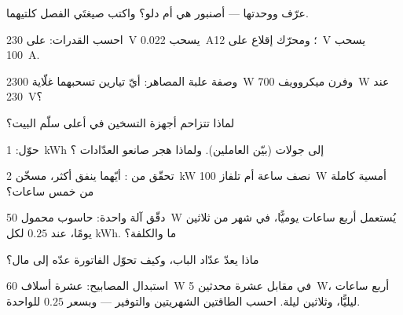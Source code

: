 \begin{exercise}[$\star$]\label{exo:g9:electric-power-energy:1}
عرّف  ووحدتها --- أصنبور هي أم دلو؟ واكتب صيغتَي الفصل
كلتيهما.
\end{exercise}

\begin{exercise}[$\star$]\label{exo:g9:electric-power-energy:2}
احسب القدرات:  على \qty{230}{V} يسحب \qty{0.022}{A}؛
ومحرّك إقلاع على \qty{12}{V} يسحب \qty{100}{A}.
\end{exercise}

\begin{exercise}[$\star$]\label{exo:g9:electric-power-energy:3}
وصفة علبة المصاهر: أيّ تيارين تسحبهما غلّاية \qty{2300}{W}
وفرن ميكروويف \qty{700}{W} عند \qty{230}{V}؟
\end{exercise}

\begin{exercise}[$\star$]\label{exo:g9:electric-power-energy:4}
لماذا تتزاحم أجهزة التسخين في أعلى سلّم  البيت؟
\end{exercise}

\begin{exercise}[$\star$]\label{exo:g9:electric-power-energy:5}
حوّل: \qty{1}{kWh} إلى جولات (بيّن العاملين). ولماذا هجر
صانعو العدّادات ؟
\end{exercise}

\begin{exercise}[$\star$]\label{exo:g9:electric-power-energy:6}
تحقّق من : أيّهما ينفق أكثر، مسخّن \qty{2}{kW} نصف ساعة
أم تلفاز \qty{100}{W} أمسية كاملة من خمس ساعات؟
\end{exercise}

\begin{exercise}[$\star$]\label{exo:g9:electric-power-energy:7}
دقّق آلة واحدة: حاسوب محمول \qty{50}{W} يُستعمل أربع ساعات
يوميًّا، في شهر من ثلاثين يومًا، عند $0.25$ لكل \unit{kWh}. ما
 والكلفة؟
\end{exercise}

\begin{exercise}[$\star$]\label{exo:g9:electric-power-energy:8}
ماذا يعدّ عدّاد الباب، وكيف تحوّل الفاتورة عدّه إلى مال؟
\end{exercise}

\begin{exercise}[$\star\star$]\label{exo:g9:electric-power-energy:9}
استبدال المصابيح: عشرة أسلاف \qty{60}{W} في مقابل عشرة
محدثين \qty{5}{W}، أربع ساعات ليليًّا، وثلاثين ليلة. احسب
الطاقتين الشهريتين والتوفير ---  وبسعر $0.25$
للواحدة.
\end{exercise}

